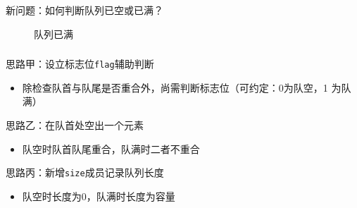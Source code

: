 \begin{fragile}
\begin{block}{新问题：如何判断队列已空或已满？}
{\begin{figure}
                \caption{队列已满}
                \label{fig:queue_full}
            \end{figure}
        }
    \end{block}
\end{fragile}

\begin{frame}
    \frametitle{\insertsubsectionhead}
    \begin{block}{思路甲：设立标志位\texttt{flag}辅助判断}
        \begin{itemize}
            \item 除检查队首与队尾是否重合外，尚需判断标志位（可约定：0为队空，1
                  为队满）
        \end{itemize}
    \end{block}
    \pause
    \begin{block}{思路乙：在队首处空出一个元素}
        \begin{itemize}
            \item 队空时队首队尾重合，队满时二者不重合
        \end{itemize}
    \end{block}
    \pause
    \begin{block}{思路丙：新增\texttt{size}成员记录队列长度}
        \begin{itemize}
            \item 队空时长度为0，队满时长度为容量
        \end{itemize}
    \end{block}
\end{frame}


